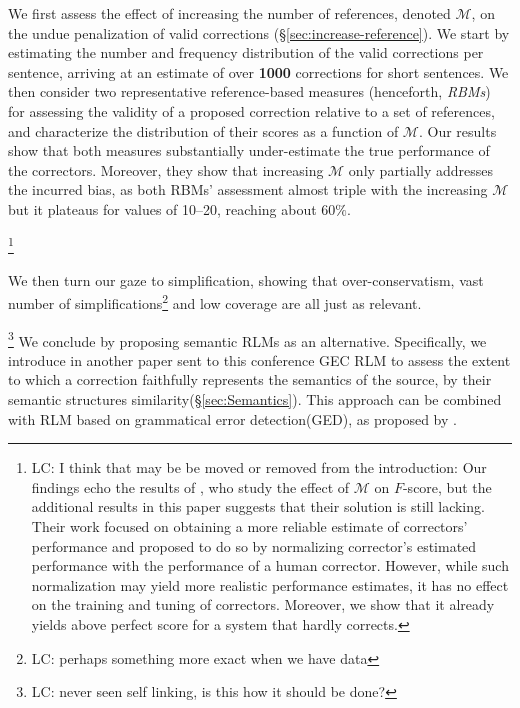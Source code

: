 \documentclass[letterpaper, 11pt]{article}
\newcommand{\lc}[1]{\footnote{\color{blue}LC: #1}}
\begin{document}
We first assess the effect of increasing the number of references, denoted $\mathcal{M}$, on the undue penalization of valid corrections (\S \ref{sec:increase-reference}).
We start by estimating the number and frequency distribution of the valid corrections per sentence, arriving at an estimate of over \textbf{1000} corrections for short sentences.
We then consider two representative reference-based measures (henceforth, {\it RBMs}) for
assessing the validity of a proposed correction relative to a set of references, 
and characterize the distribution of their scores as a function of $\mathcal{M}$. 
Our results show that both measures substantially under-estimate the true performance of
the correctors. Moreover, they show that increasing $\mathcal{M}$ only partially addresses the incurred bias, as both RBMs' assessment almost triple with the increasing $\mathcal{M}$ but it plateaus for values of 10--20, reaching about $60\%$.


\lc{I think that may be be moved or removed from the introduction:
	Our findings echo the results of \newcite{bryant2015far}, who study the effect of $\mathcal{M}$ on $F$-score, but the additional results in this paper suggests that their solution is still lacking. 
	Their work focused on obtaining a more reliable estimate of correctors' performance and proposed to do so by normalizing corrector's estimated performance with the performance of a human corrector.
However, while such normalization may yield more realistic performance estimates,
it has no effect on the training and tuning of correctors. Moreover, we show that it already yields above perfect score for a system that hardly corrects.
}

We then turn our gaze to simplification, showing that over-conservatism, vast number of simplifications\lc{perhaps something more exact when we have data} and low coverage are all just as relevant.

\lc{never seen self linking, is this how it should be done?}
We conclude by proposing semantic RLMs as an alternative. Specifically, we introduce in another paper sent to this conference GEC RLM to assess the extent to which
a correction faithfully represents the semantics of the source, by their semantic structures similarity(\S \ref{sec:Semantics}).
This approach can be combined with RLM based on grammatical error detection(GED), as proposed by .
\end{document}
